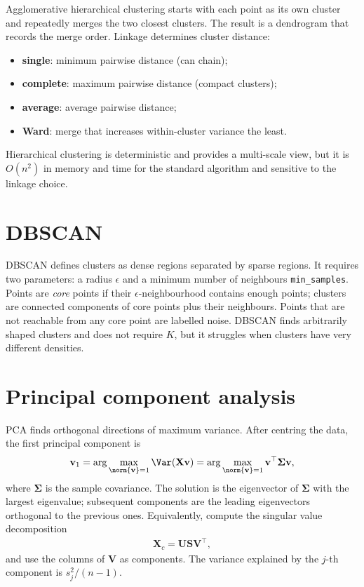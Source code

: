\documentclass[a4paper, 12pt]{book}
\begin{document}
Agglomerative hierarchical clustering starts with each point as its own cluster and
repeatedly merges the two closest clusters. The result is a dendrogram that records
the merge order. Linkage determines cluster distance:
\begin{itemize}
    \item \textbf{single}: minimum pairwise distance (can chain);
    \item \textbf{complete}: maximum pairwise distance (compact clusters);
    \item \textbf{average}: average pairwise distance;
    \item \textbf{Ward}: merge that increases within-cluster variance the least.
\end{itemize}
Hierarchical clustering is deterministic and provides a multi-scale view, but it is
$O(n^2)$ in memory and time for the standard algorithm and sensitive to the linkage
choice.

\section{DBSCAN}

DBSCAN defines clusters as dense regions separated by sparse regions. It requires two
parameters: a radius $\epsilon$ and a minimum number of neighbours
\texttt{min\_samples}. Points are \emph{core} points if their $\epsilon$-neighbourhood
contains enough points; clusters are connected components of core points plus their
neighbours. Points that are not reachable from any core point are labelled noise.
DBSCAN finds arbitrarily shaped clusters and does not require $K$, but it struggles
when clusters have very different densities.

\section{Principal component analysis}

PCA finds orthogonal directions of maximum variance. After centring the data, the
first principal component is
\begin{align}
    \mathbf{v}_1 = \arg\max_{\norm{\mathbf{v}}=1} \Var(\mathbf{X}\mathbf{v})
    = \arg\max_{\norm{\mathbf{v}}=1} \mathbf{v}^\top\boldsymbol{\Sigma}\mathbf{v},
\end{align}
where $\boldsymbol{\Sigma}$ is the sample covariance. The solution is the eigenvector
of $\boldsymbol{\Sigma}$ with the largest eigenvalue; subsequent components are the
leading eigenvectors orthogonal to the previous ones. Equivalently, compute the
singular value decomposition
\begin{align}
    \mathbf{X}_c = \mathbf{U}\mathbf{S}\mathbf{V}^\top,
\end{align}
and use the columns of $\mathbf{V}$ as components. The variance explained by the
$j$-th component is $s_j^2/(n-1)$.
\end{document}
